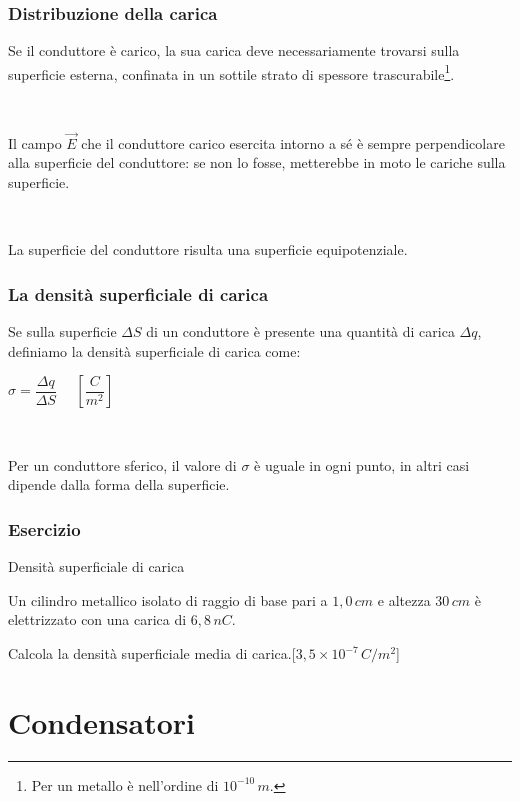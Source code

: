 \documentclass[]{beamer}
\theoremstyle{plain}
\begin{document}
\begin{frame}
\frametitle{Distribuzione della carica}
Se il conduttore è carico, \alert<1>{la sua carica deve necessariamente trovarsi sulla superficie esterna}, confinata in un sottile strato di spessore trascurabile\footnote{Per un metallo è nell'ordine di $ 10^{-10} \, m $.}.\pause

~

Il campo $ \vec{E} $ che il conduttore carico esercita intorno a sé è sempre \alert<2>{perpendicolare alla superficie del conduttore}: se non lo fosse, metterebbe in moto le cariche sulla superficie.\pause

~

La superficie del conduttore risulta una \alert<3>{superficie equipotenziale}.
\end{frame}


\begin{frame}
\frametitle{La densità superficiale di carica}
Se sulla superficie $ \Delta S $ di un conduttore è presente una quantità di carica $ \Delta q $, definiamo la \alert{densità superficiale di carica} come:
\begin{center}
\colorbox{marroncino!30}{$ \sigma = \dfrac{\Delta q}{\Delta S} $}$ ~~~~~~ \left[ \dfrac{C}{m^2} \right] $
\end{center}\pause

~

Per un conduttore sferico, il valore di $ \sigma $ è uguale in ogni punto, in altri casi dipende dalla forma della superficie.
\end{frame}


\begin{frame}
\frametitle{Esercizio}
\begin{exampleblock}{Densità superficiale di carica}
  \small{
  Un cilindro metallico isolato di raggio di base pari a $ 1,0 \, cm $ e altezza $ 30 \, cm $ è elettrizzato con una carica di $ 6,8 \, nC $.

  Calcola la densità superficiale media di carica.\hspace*{\fill}[$ 3,5 \times 10^{-7} \, C/m^2 $]}
\end{exampleblock}
\end{frame}



\section{Condensatori}
\end{document}
